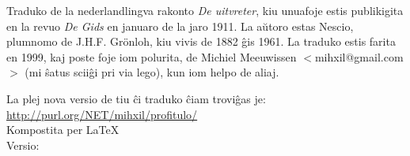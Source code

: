 \noindent
\begin{minipage}[t][0.9\textheight][b]{\textwidth}
    Traduko de la nederlandlingva rakonto {\em De uitvreter}, kiu unuafoje
    estis publikigita en la revuo {\em De Gids} en januaro de la jaro
    1911. La aŭtoro estas Nescio, plumnomo de J.H.F. Gr\"onloh, kiu
    vivis de 1882 ĝis 1961.  La traduko estis farita  en 1999, kaj
    poste foje iom polurita,  de Michiel  Meeuwissen
    $<$mihxil@gmail.com$>$ (mi ŝatus sciiĝi pri via lego), kun iom helpo de aliaj.

    La plej nova versio de tiu ĉi traduko ĉiam troviĝas je:\\
    \href{http://purl.org/NET/mihxil/profitulo/}{http://purl.org/NET/mihxil/profitulo/}\\

    Kompostita per \LaTeX\\
    Versio: \href{https://github.com/mihxil/profitulo/}{}
  \end{minipage}
